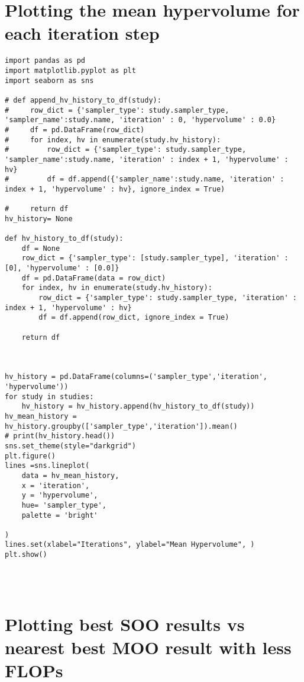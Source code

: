 \documentclass[11pt]{article}
\begin{document}
\section{Plotting the mean hypervolume for each iteration step}
\label{sec:org00451b2}
\begin{verbatim}
import pandas as pd
import matplotlib.pyplot as plt
import seaborn as sns

# def append_hv_history_to_df(study):
#     row_dict = {'sampler_type': study.sampler_type, 'sampler_name':study.name, 'iteration' : 0, 'hypervolume' : 0.0}
#     df = pd.DataFrame(row_dict)
#     for index, hv in enumerate(study.hv_history):
#         row_dict = {'sampler_type': study.sampler_type, 'sampler_name':study.name, 'iteration' : index + 1, 'hypervolume' : hv}
#         df = df.append({'sampler_name':study.name, 'iteration' : index + 1, 'hypervolume' : hv}, ignore_index = True)

#     return df
hv_history= None

def hv_history_to_df(study):
    df = None
    row_dict = {'sampler_type': [study.sampler_type], 'iteration' : [0], 'hypervolume' : [0.0]}
    df = pd.DataFrame(data = row_dict)
    for index, hv in enumerate(study.hv_history):
        row_dict = {'sampler_type': study.sampler_type, 'iteration' : index + 1, 'hypervolume' : hv}
        df = df.append(row_dict, ignore_index = True)

    return df



hv_history = pd.DataFrame(columns=('sampler_type','iteration', 'hypervolume'))
for study in studies:
    hv_history = hv_history.append(hv_history_to_df(study))
hv_mean_history = hv_history.groupby(['sampler_type','iteration']).mean()
# print(hv_history.head())
sns.set_theme(style="darkgrid")
plt.figure()
lines =sns.lineplot(
    data = hv_mean_history,
    x = 'iteration',
    y = 'hypervolume',
    hue= 'sampler_type',
    palette = 'bright'

)
lines.set(xlabel="Iterations", ylabel="Mean Hypervolume", )
plt.show()




\end{verbatim}

\section{Plotting best SOO results vs nearest best MOO result with less FLOPs}
\label{sec:orgccef309}
\end{document}
